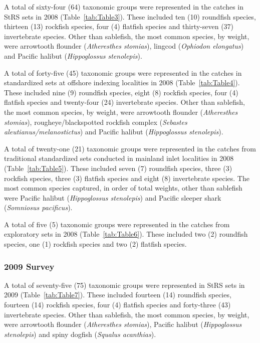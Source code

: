 \documentclass[12pt]{article}\usepackage[]{graphicx}\usepackage[]{color}
\begin{document}
A total of sixty-four (64) taxonomic groups were represented in the catches in StRS sets in 2008 (Table~\ref{tab:Table3}). These included ten (10) roundfish species, thirteen (13) rockfish species, four (4) flatfish species and thirty-seven (37) invertebrate species. Other than sablefish, the most common species, by weight, were arrowtooth flounder (\emph{Atheresthes stomias}), lingcod (\emph{Ophiodon elongatus}) and Pacific halibut (\emph{Hippoglossus stenolepis}).

A total of forty-five (45) taxonomic groups were represented in the catches in standardized sets at offshore indexing localities in 2008 (Table~\ref{tab:Table4}). These included nine (9) roundfish species, eight (8) rockfish species, four (4) flatfish species and twenty-four (24) invertebrate species. Other than sablefish, the most common species, by weight, were arrowtooth flounder (\emph{Atheresthes stomias}), rougheye/blackspotted rockfish complex (\emph{Sebastes aleutianus/melanostictus}) and Pacific halibut (\emph{Hippoglossus stenolepis}).

A total of twenty-one (21) taxonomic groups were represented in the catches from traditional standardized sets conducted in mainland inlet localities in 2008 (Table~\ref{tab:Table5}). These included seven (7) roundfish species, three (3) rockfish species, three (3) flatfish species and eight (8) invertebrate species. The most common species captured, in order of total weights, other than sablefish were Pacific halibut (\emph{Hippoglossus stenolepis}) and Pacific sleeper shark (\emph{Somniosus pacificus}).

A total of five (5) taxonomic groups were represented in the catches from exploratory sets in 2008 (Table~\ref{tab:Table6}). These included two (2) roundfish species, one (1) rockfish species and two (2) flatfish species.

\hypertarget{survey-1}{%
\subsubsection{2009 Survey}\label{survey-1}}

A total of seventy-five (75) taxonomic groups were represented in StRS sets in 2009 (Table~\ref{tab:Table7}). These included fourteen (14) roundfish species, fourteen (14) rockfish species, four (4) flatfish species and forty-three (43) invertebrate species. Other than sablefish, the most common species, by weight, were arrowtooth flounder (\emph{Atheresthes stomias}), Pacific halibut (\emph{Hippoglossus stenolepis}) and spiny dogfish (\emph{Squalus acanthias}).
\end{document}

